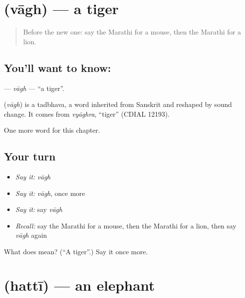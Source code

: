 \section[\texorpdfstring{\mr{वाघ} (vāgh)}{वाघ (vāgh)}]{ (vāgh) — a tiger}

\label{lesson:MR-C101-vagh}



\begin{quote}
Before the new one: say the Marathi for a mouse, then the Marathi for a lion.
\end{quote}

\subsection*{You'll want to know: }
\textbf{} — \emph{vāgh} — \textquotedblleft{}a tiger\textquotedblright{}.

\begin{cousinweb}
\textbf{} (\emph{vāgh}) is a tadbhava, a word inherited from Sanskrit and reshaped by sound change. It comes from \emph{vyāghra}, \textquotedblleft{}tiger\textquotedblright{} (CDIAL 12193).
\end{cousinweb}

\begin{grammarlens}[title={What you've built}]
One more word for this chapter.
\end{grammarlens}

\subsection*{Your turn}
\begin{itemize}
\raggedright
  \item \emph{Say it:} \emph{vāgh}
  \item \emph{Say it:} \emph{vāgh}, once more
  \item \emph{Say it:} say \emph{vāgh}
  \item \emph{Recall:} say the Marathi for a mouse, then the Marathi for a lion, then say \emph{vāgh} again
\end{itemize}

\begin{tcolorbox}[breakable,colback=teal!4,colframe=teal!35!black,title={Before you move on}]
What does  mean? (\textquotedblleft{}A tiger\textquotedblright{}.) Say it once more.
\end{tcolorbox}
\section[\texorpdfstring{\mr{हत्ती} (hattī)}{हत्ती (hattī)}]{ (hattī) — an elephant}

